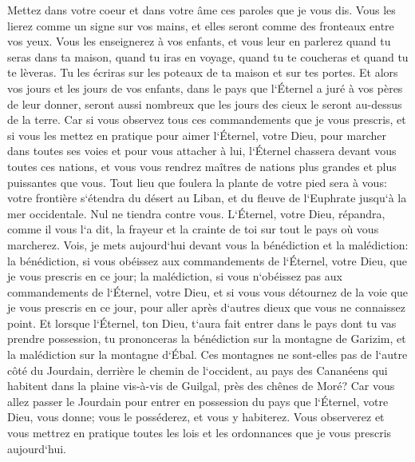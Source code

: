 \verse Mettez dans votre coeur et dans votre âme ces paroles que je vous dis. Vous les lierez comme un signe sur vos mains, et elles seront comme des fronteaux entre vos yeux. 
\verse Vous les enseignerez à vos enfants, et vous leur en parlerez quand tu seras dans ta maison, quand tu iras en voyage, quand tu te coucheras et quand tu te lèveras. 
\verse Tu les écriras sur les poteaux de ta maison et sur tes portes. 
\verse Et alors vos jours et les jours de vos enfants, dans le pays que l`Éternel a juré à vos pères de leur donner, seront aussi nombreux que les jours des cieux le seront au-dessus de la terre. 
\verse Car si vous observez tous ces commandements que je vous prescris, et si vous les mettez en pratique pour aimer l`Éternel, votre Dieu, pour marcher dans toutes ses voies et pour vous attacher à lui, 
\verse l`Éternel chassera devant vous toutes ces nations, et vous vous rendrez maîtres de nations plus grandes et plus puissantes que vous. 
\verse Tout lieu que foulera la plante de votre pied sera à vous: votre frontière s`étendra du désert au Liban, et du fleuve de l`Euphrate jusqu`à la mer occidentale. 
\verse Nul ne tiendra contre vous. L`Éternel, votre Dieu, répandra, comme il vous l`a dit, la frayeur et la crainte de toi sur tout le pays où vous marcherez. 
\verse Vois, je mets aujourd`hui devant vous la bénédiction et la malédiction: 
\verse la bénédiction, si vous obéissez aux commandements de l`Éternel, votre Dieu, que je vous prescris en ce jour; 
\verse la malédiction, si vous n`obéissez pas aux commandements de l`Éternel, votre Dieu, et si vous vous détournez de la voie que je vous prescris en ce jour, pour aller après d`autres dieux que vous ne connaissez point. 
\verse Et lorsque l`Éternel, ton Dieu, t`aura fait entrer dans le pays dont tu vas prendre possession, tu prononceras la bénédiction sur la montagne de Garizim, et la malédiction sur la montagne d`Ébal. 
\verse Ces montagnes ne sont-elles pas de l`autre côté du Jourdain, derrière le chemin de l`occident, au pays des Cananéens qui habitent dans la plaine vis-à-vis de Guilgal, près des chênes de Moré? 
\verse Car vous allez passer le Jourdain pour entrer en possession du pays que l`Éternel, votre Dieu, vous donne; vous le posséderez, et vous y habiterez. 
\verse Vous observerez et vous mettrez en pratique toutes les lois et les ordonnances que je vous prescris aujourd`hui. 

